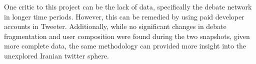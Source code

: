 \documentclass[journal,11pt]{IEEEtran}
\begin{document}
One critic to this project can be the lack of data, specifically the debate network in longer time periods. However, this can be remedied by using paid developer accounts in Tweeter. Additionally, while no significant changes in debate fragmentation and user composition were found during the two snapshots, given more complete data, the same methodology can provided more insight into the unexplored Iranian twitter sphere.
\medskip


\end{document}
